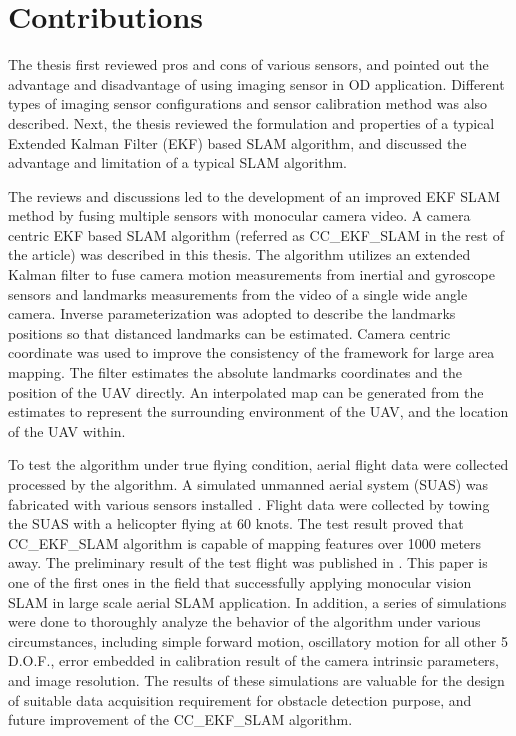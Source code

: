 \section{Contributions}\label{section:Contribution}
The thesis first reviewed pros and cons of various sensors, and pointed out the advantage and disadvantage of using
imaging sensor in OD application. Different types of imaging sensor
configurations and sensor calibration method was also described. Next, the
thesis reviewed the formulation and properties of a typical Extended
Kalman Filter (EKF) based SLAM algorithm, and discussed the advantage
and limitation of a typical SLAM algorithm. 

The reviews and discussions led to the development of an improved EKF SLAM
method by fusing multiple sensors with monocular camera video. 
A camera centric EKF based
SLAM algorithm (referred as CC\_EKF\_SLAM in the rest of the article)
was described in this thesis. The algorithm utilizes an extended Kalman
filter to fuse camera motion measurements from inertial and gyroscope
sensors and landmarks measurements from the video of a single wide angle
camera. Inverse parameterization was adopted to describe the landmarks
positions so that distanced landmarks can be estimated. Camera centric coordinate was used to improve the
consistency of the framework for large area mapping. The filter estimates the absolute landmarks coordinates and the position of the UAV directly. An interpolated map can be generated from the estimates to represent the surrounding environment of the UAV, and the location of the UAV within.

To test the algorithm under true flying condition, aerial flight data were collected processed by the algorithm. A simulated unmanned aerial system (SUAS) was fabricated with various sensors installed . Flight data were collected by towing the SUAS with a helicopter flying at 60 knots. The test result proved that CC\_EKF\_SLAM algorithm
is capable of mapping features over 1000 meters away. The preliminary
result of the test flight was published in \cite{zhang_obstacle_2012}.
This paper is one of the first ones in the field that successfully
applying monocular vision SLAM in large scale aerial SLAM application.
In addition, a series of simulations were done to thoroughly analyze
the behavior of the algorithm under various circumstances, including
simple forward motion, oscillatory motion for all other 5 D.O.F.,
error embedded in calibration result of the camera intrinsic
parameters, and image resolution. The results of these simulations are
valuable for the design of suitable data acquisition requirement for
obstacle detection purpose, and future improvement of the
CC\_EKF\_SLAM algorithm.

